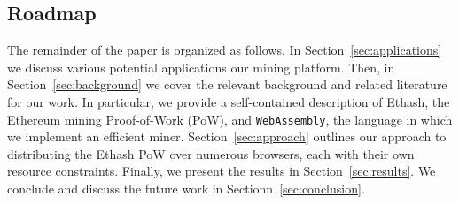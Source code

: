 \documentclass[runningheads]{llncs}
\begin{document}


\subsection{Roadmap}
The remainder of the paper is organized as follows. In Section~\ref{sec:applications} we discuss various potential applications our mining platform. Then, in Section~\ref{sec:background} we cover the relevant background and related literature for our work.  In particular, we provide a self-contained description of Ethash, the Ethereum mining Proof-of-Work (PoW), and \verb|WebAssembly|, the language in which we implement an efficient miner. Section~\ref{sec:approach} outlines our approach to distributing the Ethash PoW over numerous browsers, each with their own resource constraints. Finally, we present the results in Section~\ref{sec:results}. We conclude and discuss the future work in Sectionn~\ref{sec:conclusion}.  
\end{document}
